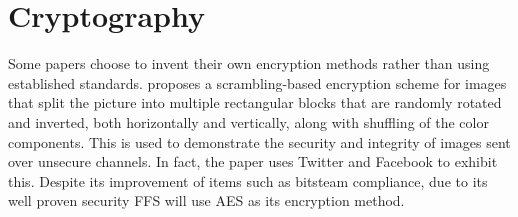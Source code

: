 \section{Cryptography}
Some papers choose to invent their own encryption methods rather than using established standards. \citeauthor{chumanEncryptionThenCompressionSystemsUsing2019} proposes a scrambling-based encryption scheme for images that split the picture into multiple rectangular blocks that are randomly rotated and inverted, both horizontally and vertically, along with shuffling of the color components\cite{chumanEncryptionThenCompressionSystemsUsing2019}. This is used to demonstrate the security and integrity of images sent over unsecure channels. In fact, the paper uses Twitter and Facebook to exhibit this. Despite its improvement of items such as bitsteam compliance, due to its well proven security FFS will use AES as its encryption method. 